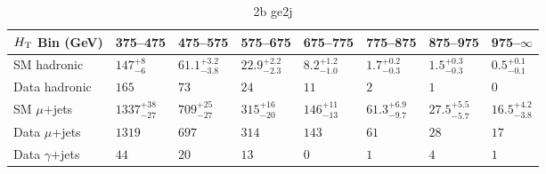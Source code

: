\documentclass[8pt]{article}
\def\scalht{\mbox{$H_{\rm{T}}$}\xspace}
\newcommand\T{\rule{0pt}{2.6ex}}
\newcommand\B{\rule[-1.2ex]{0pt}{0pt}}
\begin{document}
\begin{table}[ht!]
\caption{2b ge2j}
\label{tab:ensemble-2b ge2j}
\centering
\begin{tabular}{ llllllll }

\hline
\scalht Bin (GeV)       & 375--475                       & 475--575                       & 575--675                       & 675--775                       & 775--875                       & 875--975                       & 975--$\infty$                  \\ [1.000000ex]
\hline
SM hadronic\T           & $147^{+8}_{-6}$                & $61.1^{+3.2}_{-3.8}$           & $22.9^{+2.2}_{-2.3}$           & $8.2^{+1.2}_{-1.0}$            & $1.7^{+0.2}_{-0.3}$            & $1.5^{+0.3}_{-0.3}$            & $0.5^{+0.1}_{-0.1}$            \\ 
Data hadronic\B         & $165$                          & $73$                           & $24$                           & $11$                           & $2$                            & $1$                            & $0$                            \\ 
\hline
SM $\mu$+jets\T         & $1337^{+38}_{-27}$             & $709^{+25}_{-27}$              & $315^{+16}_{-20}$              & $146^{+11}_{-13}$              & $61.3^{+6.9}_{-9.7}$           & $27.5^{+5.5}_{-5.7}$           & $16.5^{+4.2}_{-3.8}$           \\ 
Data $\mu$+jets\B       & $1319$                         & $697$                          & $314$                          & $143$                          & $61$                           & $28$                           & $17$                           \\ 
\hline
Data $\gamma$+jets\B    & $44$                           & $20$                           & $13$                           & $0$                            & $1$                            & $4$                            & $1$                            \\ 
\hline

\end{tabular}
\end{table}
\end{document}
